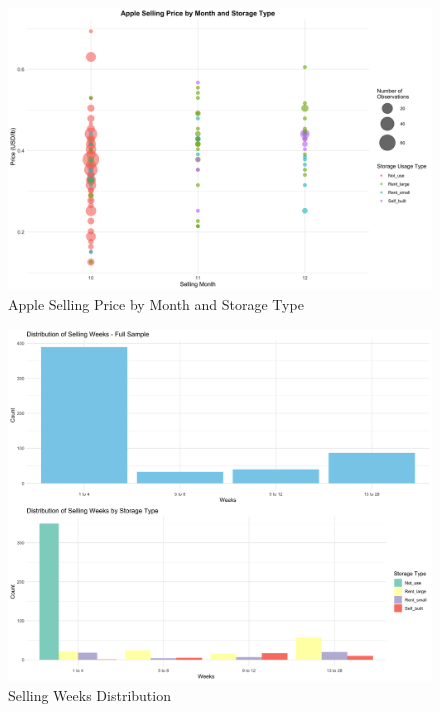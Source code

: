 \documentclass[12pt]{article}
\begin{document}
\begin{figure}[H]
\centering
\includegraphics[width=1\textwidth]{figures/apple_price_bubble_plot.png}
\caption{Apple Selling Price by Month and Storage Type}
\label{Figure: selling price bubble}
\end{figure}

\begin{figure}[H]
\centering
\includegraphics[width=1\textwidth]{figures/selling_weeks_distribution.png}
\caption{Selling Weeks Distribution}
\label{Figure: selling weeks distribution}
\end{figure}
\end{document}
